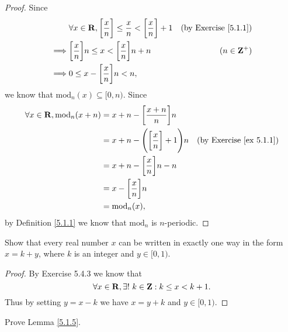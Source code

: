 \begin{proof}
    Since
    \begin{align*}
                 & \forall x \in \mathbf{R}, \bigg[\frac{x}{n}\bigg] \leq \frac{x}{n} < \bigg[\frac{x}{n}\bigg] + 1 & \text{(by Exercise \ref{5.1.1})} \\
        \implies & \bigg[\frac{x}{n}\bigg] n \leq x < \bigg[\frac{x}{n}\bigg] n + n                         & (n \in \mathbf{Z}^+)                     \\
        \implies & 0 \leq x - \bigg[\frac{x}{n}\bigg] n < n,
    \end{align*}
    we know that \(\text{mod}_n(x) \subseteq [0, n)\).
    Since
    \begin{align*}
        \forall x \in \mathbf{R}, \text{mod}_n(x + n) & = x + n - \bigg[\frac{x + n}{n}\bigg] n                                                   \\
                                              & = x + n - \Bigg(\bigg[\frac{x}{n}\bigg] + 1\Bigg) n & \text{(by Exercise \ref{ex 5.1.1})} \\
                                              & = x + n - \bigg[\frac{x}{n}\bigg] n - n                                                   \\
                                              & = x - \bigg[\frac{x}{n}\bigg] n                                                           \\
                                              & = \text{mod}_n(x),
    \end{align*}
    by Definition \ref{5.1.1} we know that \(\text{mod}_n\) is \(n\)-periodic.
\end{proof}

\exercisesection

\begin{exercise}\label{ex 5.1.1}
    Show that every real number \(x\) can be written in exactly one way in the form \(x = k + y\), where \(k\) is an integer and \(y \in [0, 1)\).
\end{exercise}

\begin{proof}
    By Exercise 5.4.3 we know that
    \[
        \forall x \in \mathbf{R}, \exists!\ k \in \mathbf{Z} : k \leq x < k + 1.
    \]
    Thus by setting \(y = x - k\) we have \(x = y + k\) and \(y \in [0, 1)\).
\end{proof}

\begin{exercise}\label{ex 5.1.2}
    Prove Lemma \ref{5.1.5}.
\end{exercise}

